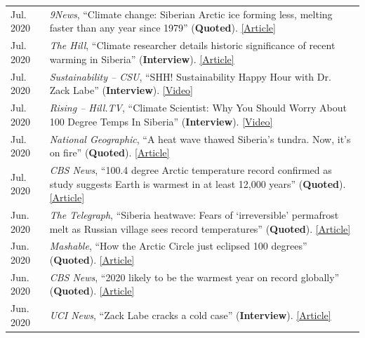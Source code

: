 \documentclass[margin,line,palatino,courier,10pt]{res}
\begin{document}
\begin{resume}
\begin{tabular}{@{}p{0.9in}p{4in}}
Jul. 2020 & \textit{9News}, ``Climate change: Siberian Arctic ice forming less, melting faster than any year since 1979'' (\textbf{Quoted}). \href{https://www.9news.com.au/world/climate-change-global-warming-siberian-heatwave-arctic-ice-melting-faster-us-research-data/}{[Article]}\\
Jul. 2020 & \textit{The Hill}, ``Climate researcher details historic significance of recent warming in Siberia'' (\textbf{Interview}). \href{https://thehill.com/hilltv/rising/507850-climate-researcher-details-historic-significance-of-recent-warming-in-siberia}{[Article]}\\
Jul. 2020 & \textit{Sustainability -- CSU}, ``SHH! Sustainability Happy Hour with Dr. Zack Labe'' (\textbf{Interview}). \href{https://www.youtube.com/watch?v=E6htTPoeXQ8&feature=youtu.be}{[Video]}\\
Jul. 2020 & \textit{Rising -- Hill.TV}, ``Climate Scientist: Why You Should Worry About 100 Degree Temps In Siberia'' (\textbf{Interview}). \href{https://www.youtube.com/watch?v=fw4fG-_aI28&feature=youtu.be}{[Video]}\\
Jul. 2020 & \textit{National Geographic}, ``A heat wave thawed Siberia’s tundra. Now, it’s on fire'' (\textbf{Quoted}). \href{https://www.nationalgeographic.com/science/2020/07/heat-wave-thawed-siberia-now-on-fire/#close}{[Article]}\\
Jul. 2020 & \textit{CBS News}, ``100.4 degree Arctic temperature record confirmed as study suggests Earth is warmest in at least 12,000 years'' (\textbf{Quoted}). \href{https://www.cbsnews.com/news/arctic-temperature-record-100-4-degrees-earth-warmest-12000-years/}{[Article]}\\
Jun. 2020 & \textit{The Telegraph}, ``Siberia heatwave: Fears of `irreversible' permafrost melt as Russian village sees record temperatures'' (\textbf{Quoted}). \href{https://www.telegraph.co.uk/news/2020/06/26/siberia-heatwave-fears-irreversible-permafrost-meltas-russian/}{[Article]}\\
Jun. 2020 & \textit{Mashable}, ``How the Arctic Circle just eclipsed 100 degrees'' (\textbf{Quoted}). \href{https://mashable.com/article/arctic-heat-100-degrees/}{[Article]}\\
Jun. 2020 & \textit{CBS News}, ``2020 likely to be the warmest year on record globally'' (\textbf{Quoted}). \href{https://www.cbsnews.com/news/warmest-year-on-record-2020-likely/}{[Article]}\\
Jun. 2020 & \textit{UCI News}, ``Zack Labe cracks a cold case'' (\textbf{Interview}). \href{https://medium.com/@UCISoPS/zack-labe-cracks-a-cold-case-6e8793248e9d}{[Article]}\\

\end{tabular}
\end{resume}
\end{document}
